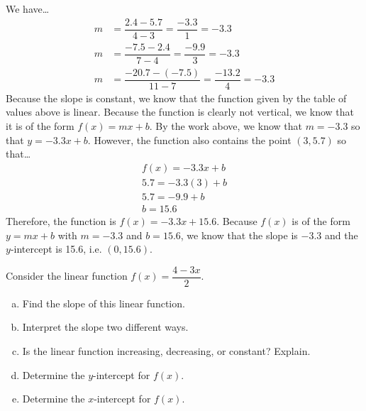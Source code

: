 \documentclass[11pt,letterpaper]{article}
\begin{document}
\sol We have\dots \pspace
	\[
	\begin{aligned}
	m&= \dfrac{2.4 - 5.7}{4 - 3}= \dfrac{-3.3}{1}= -3.3 \\[0.3cm]
	m&= \dfrac{-7.5 - 2.4}{7 - 4}= \dfrac{-9.9}{3}= -3.3 \\[0.3cm]
	m&= \dfrac{-20.7 - (-7.5)}{11 - 7}= \dfrac{-13.2}{4}= -3.3
	\end{aligned}
	\] \pspace
Because the slope is constant, we know that the function given by the table of values above is linear. Because the function is clearly not vertical, we know that it is of the form $f(x)= mx + b$. By the work above, we know that $m= -3.3$ so that $y= -3.3x + b$. However, the function also contains the point $(3, 5.7)$ so that\dots \pspace
	\[
	\begin{aligned}
	f(x)= -3.3x + b \\[0.3cm]
	5.7= -3.3(3) + b \\[0.3cm]
	5.7= -9.9 + b \\[0.3cm]
	b= 15.6
	\end{aligned}
	\] \pspace
Therefore, the function is $f(x)= -3.3x + 15.6$. Because $f(x)$ is of the form $y= mx + b$ with $m= -3.3$ and $b= 15.6$, we know that the slope is $-3.3$ and the $y$-intercept is 15.6, i.e. $(0, 15.6)$. 



\newpage



 Consider the linear function $f(x)= \dfrac{4 - 3x}{2}$.
	\begin{enumerate}[(a)]
	\item Find the slope of this linear function. 
	\item Interpret the slope two different ways.
	\item Is the linear function increasing, decreasing, or constant? Explain. 
	\item Determine the $y$-intercept for $f(x)$.
	\item Determine the $x$-intercept for $f(x)$.
	\end{enumerate} \pspace
\end{document}
